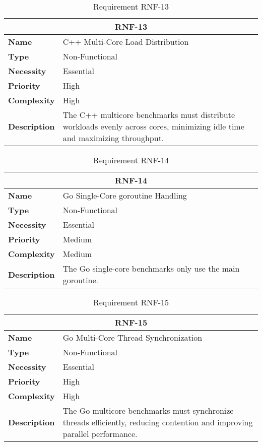 \begin{table}[H]
    \centering
    \begin{tabular}{l p{10cm}}
        \toprule
        \multicolumn{2}{c}{\textbf{RNF-13}} \\
        \toprule
        \textbf{Name}         & C++ Multi-Core Load Distribution \\
        \textbf{Type}         & Non-Functional \\
        \textbf{Necessity}    & Essential \\
        \textbf{Priority}     & High \\
        \textbf{Complexity}   & High \\
        \textbf{Description}  & The C++ multicore benchmarks must distribute workloads evenly across cores, minimizing idle time and maximizing throughput. \\
        \bottomrule
    \end{tabular}
\caption{Requirement RNF-13}\label{tab:rnf-13}
\end{table}

\begin{table}[H]
    \centering
    \begin{tabular}{l p{10cm}}
        \toprule
        \multicolumn{2}{c}{\textbf{RNF-14}} \\
        \toprule
        \textbf{Name}         & Go Single-Core \Gls{goroutine} Handling \\
        \textbf{Type}         & Non-Functional \\
        \textbf{Necessity}    & Essential \\
        \textbf{Priority}     & Medium \\
        \textbf{Complexity}   & Medium \\
        \textbf{Description}  & The Go single-core benchmarks only use the main \gls{goroutine}. \\
        \bottomrule
    \end{tabular}
\caption{Requirement RNF-14}\label{tab:rnf-14}
\end{table}

\begin{table}[H]
    \centering
    \begin{tabular}{l p{10cm}}
        \toprule
        \multicolumn{2}{c}{\textbf{RNF-15}} \\
        \toprule
        \textbf{Name}         & Go Multi-Core Thread Synchronization \\
        \textbf{Type}         & Non-Functional \\
        \textbf{Necessity}    & Essential \\
        \textbf{Priority}     & High \\
        \textbf{Complexity}   & High \\
        \textbf{Description}  & The Go multicore benchmarks must synchronize threads efficiently, reducing contention and improving parallel performance. \\
        \bottomrule
    \end{tabular}
\caption{Requirement RNF-15}\label{tab:rnf-15}
\end{table}

